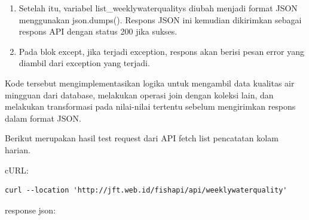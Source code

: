\begin{enumerate}[1.]
\begin{enumerate}
\item Setelah itu, variabel list\_weeklywaterqualitys diubah menjadi format JSON menggunakan json.dumps(). Respons JSON ini kemudian dikirimkan sebagai respons API dengan status 200 jika sukses.

\item Pada blok except, jika terjadi exception, respons akan berisi pesan error yang diambil dari exception yang terjadi.

\end{enumerate}

Kode tersebut mengimplementasikan logika untuk mengambil data kualitas air mingguan dari database, melakukan operasi join dengan koleksi lain, dan melakukan transformasi pada nilai-nilai tertentu sebelum mengirimkan respons dalam format JSON.

Berikut merupakan hasil test request dari API fetch list pencatatan kolam harian.

cURL:

\begin{lstlisting}
curl --location 'http://jft.web.id/fishapi/api/weeklywaterquality'
\end{lstlisting}

response json:


\end{enumerate}
